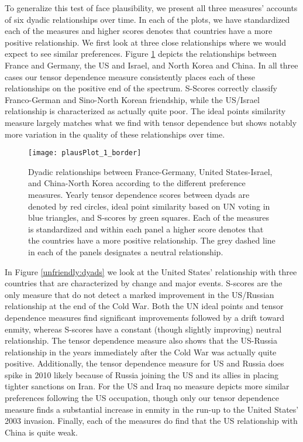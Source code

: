 To generalize this test of face plausibility, we present all three measures' accounts of six dyadic relationships over time. In each of the plots, we have standardized each of the measures and higher scores denotes that countries have a more positive relationship. We first look at three close relationships where we would expect to see similar preferences. Figure \ref{friendly:dyads} depicts the relationships between France and Germany, the US and Israel, and North Korea and China. In all three cases our tensor dependence measure consistently places each of these relationships on the positive end of the spectrum. S-Scores correctly classify Franco-German and Sino-North Korean friendship, while the US/Israel relationship is characterized as actually quite poor. The ideal points similarity measure largely matches what we find with tensor dependence but shows notably more variation in the quality of these relationships over time.

\begin{figure}
	\centering
	\texttt{[image: plausPlot\_1\_border]}
	\caption{Dyadic relationships between France-Germany, United States-Israel, and China-North Korea according to the different preference measures. Yearly tensor dependence scores between dyads are denoted by red circles, ideal point similarity based on UN voting in blue triangles, and S-scores by green squares. Each of the measures is standardized and within each panel a higher score denotes that the countries have a more positive relationship. The grey dashed line in each of the panels designates a neutral relationship.}
	\label{friendly:dyads}
\end{figure}

In Figure \ref{unfriendly:dyads} we look at the United States' relationship with three countries that are characterized by change and major events. S-scores are the only measure that do not detect a marked improvement in the US/Russian relationship at the end of the Cold War. Both the UN ideal points and tensor dependence measures find significant improvements followed by a drift toward enmity, whereas S-scores have a constant (though slightly improving) neutral relationship. The tensor dependence measure also shows that the US-Russia relationship in the years immediately after the Cold War was actually quite positive. Additionally, the tensor dependence measure for US and Russia does spike in 2010 likely because of Russia joining the US and its allies in placing tighter sanctions on Iran. For the US and Iraq no measure depicts more similar preferences following the US occupation, though only our tensor dependence measure finds a substantial increase in enmity in the run-up to the United States' 2003 invasion. Finally, each of the measures do find that the US relationship with China is quite weak.

